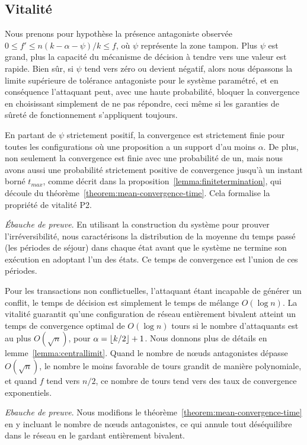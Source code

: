 \documentclass[a4,twocolumn,10pt]{article}
\DeclarePairedDelimiter{\floor}{\lfloor}{\rfloor}
\newcommand{\Oh}[1]{O(#1)}
\theoremstyle{definition}
\begin{document}
\subsection{Vitalité}

Nous prenons pour hypothèse la présence antagoniste observée $0 \leq f' \leq n(k - \alpha - \psi)/k \leq f$, où $\psi$
représente la zone tampon.
Plus $\psi$ est grand, plus la capacité du mécanisme de décision à tendre vers une valeur est rapide. Bien sûr, si $\psi$
tend vers zéro ou devient négatif, alors nous dépassons la limite supérieure de tolérance antagoniste pour le système
paramétré, et en conséquence l'attaquant peut, avec une haute probabilité, bloquer la convergence en choisissant simplement
de ne pas répondre, ceci même si les garanties de sûreté de fonctionnement s'appliquent toujours.

En partant de $\psi$ strictement positif, la convergence est strictement finie pour toutes les configurations où une
proposition a un support d'au moins $\alpha$. De plus, non seulement la convergence est finie avec une probabilité de
un, mais nous avons aussi une probabilité strictement positive de convergence jusqu'à un instant borné $t_{max}$, comme
décrit dans la proposition~\ref{lemma:finitetermination}, qui découle du théorème~\ref{theorem:mean-convergence-time}.
Cela formalise la propriété de vitalité P2.

\noindent \emph{Ébauche de preuve}. En utilisant la construction du système pour prouver l'irréversibilité, nous
caractérisons la distribution de la moyenne du temps passé (les périodes de séjour) dans chaque état avant que le
système ne termine son exécution en adoptant l'un des états. Ce temps de convergence est l'union de ces périodes.

Pour les transactions non conflictuelles, l'attaquant étant incapable de générer un conflit, le temps de décision
est simplement le temps de mélange $\Oh{\log{n}}$. La vitalité guarantit qu'une configuration de réseau
entièrement bivalent atteint un temps de convergence optimal de $\Oh{\log{n}}$ tours si le nombre d'attaquants est au
plus $\Oh{\sqrt{n}}$, pour $\alpha = \floor{k/2} + 1$. Nous donnons plus de détails en
lemme~\ref{lemma:centrallimit}.
Quand le nombre de nœuds antagonistes dépasse $\Oh{\sqrt{n}}$, le nombre le moins favorable de tours grandit de manière
polynomiale, et quand $f$ tend vers $n/2$, ce nombre de tours tend vers des taux de convergence exponentiels.

\noindent \emph{Ebauche de preuve}. Nous modifions le théorème~\ref{theorem:mean-convergence-time} en y incluant le
nombre de nœuds antagonistes, ce qui annule tout déséquilibre dans le réseau en le gardant entièrement bivalent.
\end{document}
